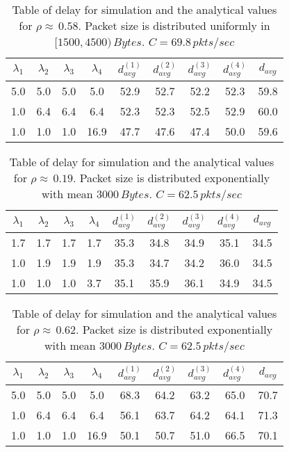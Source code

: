 \documentclass[10pt, conference, compsocconf]{IEEEtran}
\begin{document}
\begin{table}[!h]
\caption{Table of delay for simulation and the analytical values for $\rho \approx \, 0.58$. Packet size is distributed uniformly in $[1500, 4500) \, Bytes$. $C = 69.8\, pkts/sec$ }
\begin{center}
\begin{tabular}{|c|c|c|c|c|c|c|c|c|}
\hline $\lambda_1 $ & $\lambda_2$ & $\lambda_3$ & $\lambda_4$ & $d^{(1)}_{avg}$ & $d^{(2)}_{avg}$ & $d^{(3)}_{avg}$ & $d^{(4)}_{avg}$ & $d_{avg}$  \\ 
\hline  5.0 & 5.0 & 5.0 & 5.0 & 52.9 & 52.7 & 52.2 & 52.3 & 59.8 \\ 
\hline  1.0 & 6.4 & 6.4 & 6.4 & 52.3 & 52.3 & 52.5 & 52.9 & 60.0 \\ 
\hline  1.0 & 1.0 & 1.0 & 16.9 & 47.7 & 47.6 & 47.4 & 50.0 & 59.6 \\ 
\hline 
\end{tabular} 
\end{center}
\label{table6}
\end{table}

\begin{table}[!h]
\caption{Table of delay for simulation and the analytical values for $\rho \approx \, 0.19$. Packet size is distributed exponentially with mean $3000 \, Bytes$. $C = 62.5\, pkts/sec$ }
\begin{center}
\begin{tabular}{|c|c|c|c|c|c|c|c|c|}
\hline $\lambda_1 $ & $\lambda_2$ & $\lambda_3$ & $\lambda_4$ & $d^{(1)}_{avg}$ & $d^{(2)}_{avg}$ & $d^{(3)}_{avg}$ & $d^{(4)}_{avg}$ & $d_{avg}$  \\ 
\hline  1.7 & 1.7 & 1.7 & 1.7 & 35.3 & 34.8 & 34.9 & 35.1 & 34.5 \\ 
\hline  1.0 & 1.9 & 1.9 & 1.9 & 35.3 & 34.7 & 34.2 & 36.0 & 34.5 \\ 
\hline  1.0 & 1.0 & 1.0 & 3.7 & 35.1 & 35.9 & 36.1 & 34.9 & 34.5 \\ 
\hline 
\end{tabular} 
\end{center}
\label{table7}
\end{table}

\begin{table}[!h]
\caption{Table of delay for simulation and the analytical values for $\rho \approx \, 0.62$. Packet size is distributed exponentially with mean $3000 \, Bytes$. $C = 62.5\, pkts/sec$ }
\begin{center}
\begin{tabular}{|c|c|c|c|c|c|c|c|c|}
\hline $\lambda_1 $ & $\lambda_2$ & $\lambda_3$ & $\lambda_4$ & $d^{(1)}_{avg}$ & $d^{(2)}_{avg}$ & $d^{(3)}_{avg}$ & $d^{(4)}_{avg}$ & $d_{avg}$  \\ 
\hline  5.0 & 5.0 & 5.0 & 5.0 & 68.3 & 64.2 & 63.2 & 65.0 & 70.7 \\ 
\hline  1.0 & 6.4 & 6.4 & 6.4 & 56.1 & 63.7 & 64.2 & 64.1 & 71.3 \\ 
\hline  1.0 & 1.0 & 1.0 & 16.9 & 50.1 & 50.7 & 51.0 & 66.5 & 70.1 \\ 
\hline 
\end{tabular} 
\end{center}
\label{table8}
\end{table}
\end{document}
